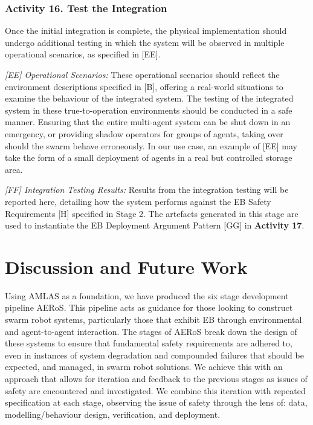 \documentclass[runningheads]{llncs}
\begin{document}
\vspace{-2ex}
\subsubsection*{Activity 16. Test the Integration}

Once the initial integration is complete, the physical implementation should undergo additional testing in which the system will be observed in multiple operational scenarios, as specified in [EE].

\emph{[EE] Operational Scenarios:} These operational scenarios should reflect the environment descriptions specified in [B], offering a real-world situations to examine the behaviour of the integrated system. The testing of the integrated system in these true-to-operation environments should be conducted in a safe manner. Ensuring that the entire multi-agent system can be shut down in an emergency, or providing shadow operators for groups of agents, taking over should the swarm behave erroneously. In our use case, an example of [EE] may take the form of a small deployment of agents in a real but controlled storage area.

\emph{[FF] Integration Testing Results:} Results from the integration testing will be reported here, detailing how the system performs against the EB Safety Requirements [H] specified in Stage 2. 
The artefacts generated in this stage are used to instantiate the EB Deployment Argument Pattern [GG] in \textbf{Activity 17}.

\vspace{-2ex}
\section{Discussion and Future Work} \label{discussion-conclusions}
Using AMLAS \cite{Hawkins2021} as a foundation, we have produced the six stage development pipeline AERoS. This pipeline acts as guidance for those looking to construct swarm robot systems, particularly those that exhibit EB through environmental and agent-to-agent interaction. The stages of AERoS break down the design of these systems to ensure that fundamental safety requirements are adhered to, even in instances of system degradation and compounded failures that should be expected, and managed, in swarm robot solutions. We achieve this with an approach that allows for iteration and feedback to the previous stages as issues of safety are encountered and investigated. We combine this iteration with repeated specification at each stage, observing the issue of safety through the lens of: data, modelling/behaviour design, verification, and deployment.
\end{document}
